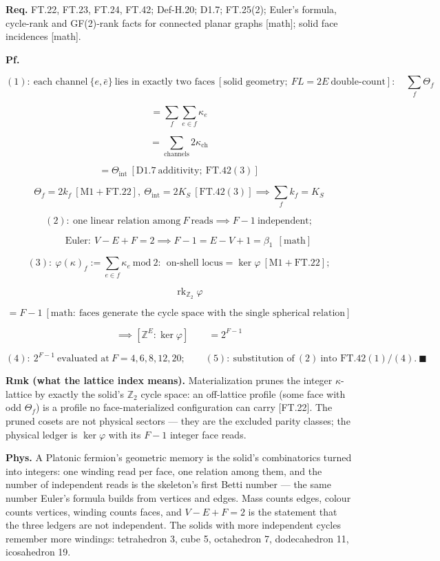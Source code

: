 \begin{theorem}
\textbf{Req.} FT.22, FT.23, FT.24, FT.42; Def-H.20; D1.7; FT.25(2); Euler's formula, cycle-rank and GF(2)-rank facts for connected planar graphs [math]; solid face incidences [math].

\textbf{Pf.}

\[
(1):\ \text{each channel}\ \{e,\bar e\}\ \text{lies in exactly two faces}\ [\text{solid geometry};\ FL=2E\ \text{double-count}]:\quad\sum_f\Theta_f
\]

\[
= \sum_f\sum_{e\in f}\kappa_e
\]

\[
= \sum_{\text{channels}}2\kappa_{\mathrm{ch}}
\]

\[
= \Theta_{\mathrm{int}}\ [\mathrm{D1.7}\ \text{additivity};\ \mathrm{FT.42}(3)]
\]

\[
\Theta_f=2k_f\ [\mathrm{M1}+\mathrm{FT.22}],\ \Theta_{\mathrm{int}}=2K_S\ [\mathrm{FT.42}(3)]\implies\sum_fk_f=K_S
\]

\[
(2):\ \text{one linear relation among}\ F\ \text{reads}\implies F-1\ \text{independent};
\]

\[
\qquad \text{Euler}:\ V-E+F=2\implies F-1=E-V+1=\beta_1\ \ [\text{math}]
\]

\[
(3):\ \varphi(\kappa)_f:=\sum_{e\in f}\kappa_e\ \mathrm{mod}\ 2:\ \ \text{on-shell locus}=\ker\varphi\ [\mathrm{M1}+\mathrm{FT.22}];
\]

\[
\qquad \operatorname{rk}_{\mathbb Z_2}\varphi
\]

\[
= F-1\ [\text{math}:\ \text{faces generate the cycle space with the single spherical relation}]
\]

\[
\implies [\mathbb Z^E:\ker\varphi]\qquad = 2^{F-1}
\]

\[
(4):\ 2^{F-1}\ \text{evaluated at}\ F=4,6,8,12,20;\qquad(5):\ \text{substitution of}\ (2)\ \text{into FT.42}(1)/(4).\ \blacksquare
\]

\textbf{Rmk (what the lattice index means).} Materialization prunes the integer $\kappa$-lattice by exactly the solid's $\mathbb Z_2$ cycle space: an off-lattice profile (some face with odd $\Theta_f$) is a profile no face-materialized configuration can carry [FT.22]. The pruned cosets are not physical sectors — they are the excluded parity classes; the physical ledger is $\ker\varphi$ with its $F-1$ integer face reads.

\textbf{Phys.} A Platonic fermion's geometric memory is the solid's combinatorics turned into integers: one winding read per face, one relation among them, and the number of independent reads is the skeleton's first Betti number — the same number Euler's formula builds from vertices and edges. Mass counts edges, colour counts vertices, winding counts faces, and $V-E+F=2$ is the statement that the three ledgers are not independent. The solids with more independent cycles remember more windings: tetrahedron 3, cube 5, octahedron 7, dodecahedron 11, icosahedron 19.


\end{theorem}
